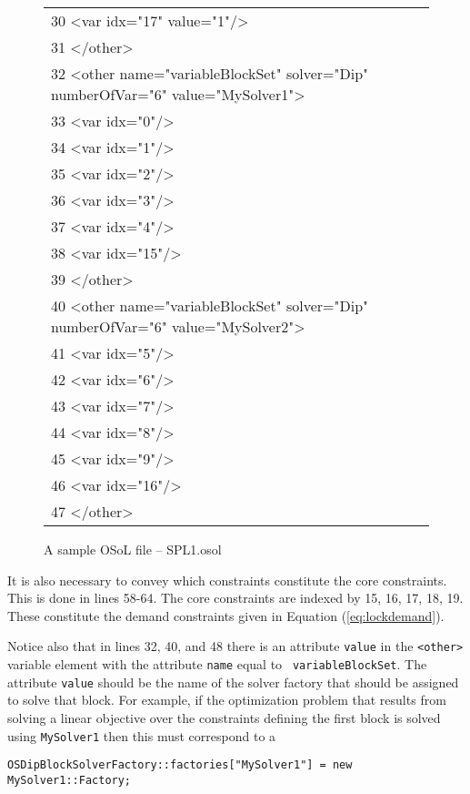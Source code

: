 {\begin{figure}[hp]
{{{\begin{tabular}{@{}l@{}}
30              <var idx="17" value="1"/>\\
31           </other>\\
32           <other name="variableBlockSet" solver="Dip" numberOfVar="6" value="MySolver1">\\
33              <var idx="0"/>\\
34              <var idx="1"/>\\
35              <var idx="2"/>\\
36              <var idx="3"/>\\
37              <var idx="4"/>\\
38              <var idx="15"/>\\
39           </other>\\
40           <other name="variableBlockSet" solver="Dip" numberOfVar="6" value="MySolver2">\\
41              <var idx="5"/>\\
42              <var idx="6"/>\\
43              <var idx="7"/>\\
44              <var idx="8"/>\\
45              <var idx="9"/>\\
46              <var idx="16"/>\\
47           </other>\\
\end{tabular} }}} \medskip
\caption{A sample OSoL file -- SPL1.osol}\label{figure:parinc-osil}
\end{figure}
} %


It is also necessary to convey which constraints constitute the core
constraints. This is done in lines 58-64. The core constraints are indexed by
15, 16, 17, 18, 19. These constitute the demand constraints given in Equation
(\ref{eq:lockdemand}). 


Notice also that in lines 32, 40, and 48 there is an attribute {\tt value} in
the {\tt <other>} variable element with the attribute {\tt name} equal to {\tt
variableBlockSet}.  The attribute {\tt value} should be the name of the solver
factory that should be assigned to solve that block. For example, if the
optimization problem that results from solving a linear objective over the
constraints defining the first block is solved using {\tt MySolver1} then this
must correspond to a 

\begin{verbatim}
OSDipBlockSolverFactory::factories["MySolver1"] = new
MySolver1::Factory;
\end{verbatim}  

